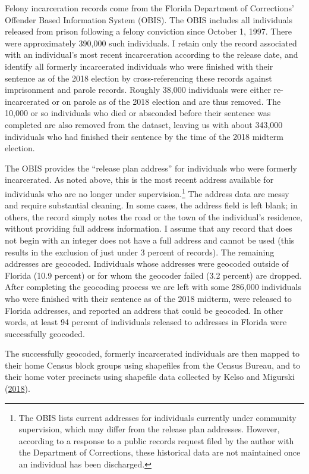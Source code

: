 \documentclass[
  12pt,
]{article}
\begin{document}
Felony incarceration records come from the Florida Department of Corrections' Offender Based Information System (OBIS). The OBIS includes all individuals released from prison following a felony conviction since October 1, 1997. There were approximately 390,000 such individuals. I retain only the record associated with an individual's most recent incarceration according to the release date, and identify all formerly incarcerated individuals who were finished with their sentence as of the 2018 election by cross-referencing these records against imprisonment and parole records. Roughly 38,000 individuals were either re-incarcerated or on parole as of the 2018 election and are thus removed. The 10,000 or so individuals who died or absconded before their sentence was completed are also removed from the dataset, leaving us with about 343,000 individuals who had finished their sentence by the time of the 2018 midterm election.

The OBIS provides the ``release plan address'' for individuals who were formerly incarcerated. As noted above, this is the most recent address available for individuals who are no longer under supervision.\footnote{The OBIS lists current addresses for individuals currently under community supervision, which may differ from the release plan addresses. However, according to a response to a public records request filed by the author with the Department of Corrections, these historical data are not maintained once an individual has been discharged.} The address data are messy and require substantial cleaning. In some cases, the address field is left blank; in others, the record simply notes the road or the town of the individual's residence, without providing full address information. I assume that any record that does not begin with an integer does not have a full address and cannot be used (this results in the exclusion of just under 3 percent of records). The remaining addresses are geocoded. Individuals whose addresses were geocoded outside of Florida (10.9 percent) or for whom the geocoder failed (3.2 percent) are dropped. After completing the geocoding process we are left with some 286,000 individuals who were finished with their sentence as of the 2018 midterm, were released to Florida addresses, and reported an address that could be geocoded. In other words, at least 94 percent of individuals released to addresses in Florida were successfully geocoded.

The successfully geocoded, formerly incarcerated individuals are then mapped to their home Census block groups using shapefiles from the Census Bureau, and to their home voter precincts using shapefile data collected by Kelso and Migurski (\protect\hyperlink{ref-Kelso2018}{2018}).
\end{document}
